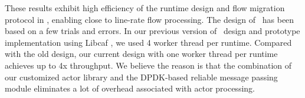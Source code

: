 These results exhibit high efficiency of the runtime design and flow migration protocol in \nfactor, enabling close to line-rate flow processing. %
 The design of \nfactor~has been based on a few trials and errors. In our previous version of \nfactor~design and prototype implementation using Libcaf \cite{caf}, we used 4 worker thread per runtime. Compared with the old design, our current design with one worker thread per runtime achieves up to 4x throughput. %
 We believe the reason is that the combination of our customized actor library and the DPDK-based reliable message passing module eliminates a lot of overhead associated with actor processing.%


